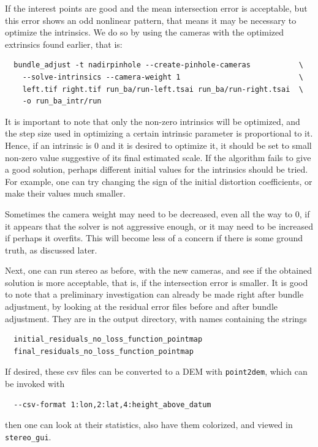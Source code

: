 If the interest points are good and the mean intersection error is
acceptable, but this error shows an odd nonlinear pattern, that means
it may be necessary to optimize the intrinsics. We do so by using the
cameras with the optimized extrinsics found earlier, that is:

\begin{verbatim}
  bundle_adjust -t nadirpinhole --create-pinhole-cameras           \
    --solve-intrinsics --camera-weight 1                           \
    left.tif right.tif run_ba/run-left.tsai run_ba/run-right.tsai  \
    -o run_ba_intr/run
\end{verbatim}

It is important to note that only the non-zero intrinsics will be optimized, and the step size
used in optimizing a certain intrinsic parameter is proportional to it. Hence,
if an intrinsic is 0 and it is desired to optimize it, it should be set
to small non-zero value suggestive of its final estimated scale. If
the algorithm fails to give a good solution, perhaps different initial values
for the intrinsics should be tried. For example, one can try changing the sign
of the initial distortion coefficients, or make their values much smaller.

Sometimes the camera weight may need to be decreased, even all the way
to 0, if it appears that the solver is not aggressive enough, or it may
need to be increased if perhaps it overfits. This will become less of a
concern if there is some ground truth, as discussed later.

Next, one can run stereo as before, with the new cameras, and
see if the obtained solution is more acceptable, that is, if the
intersection error is smaller. It is good to note that a preliminary
investigation can already be made right after bundle adjustment, by
looking at the residual error files before and after bundle
adjustment. They are in the output directory, with names containing the
strings
\begin{verbatim}
  initial_residuals_no_loss_function_pointmap
  final_residuals_no_loss_function_pointmap
\end{verbatim}

If desired, these csv files can be converted to a DEM with
\texttt{point2dem}, which can be invoked with
\begin{verbatim}
  --csv-format 1:lon,2:lat,4:height_above_datum
\end{verbatim}

then one can look at their statistics, also have them colorized,
and viewed in \texttt{stereo\_gui}.


